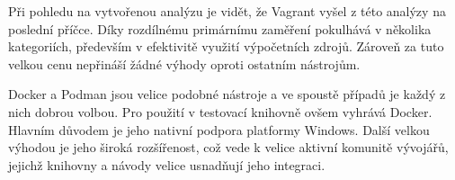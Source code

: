 Při pohledu na vytvořenou analýzu je vidět, že Vagrant vyšel z této analýzy na poslední příčce. Díky rozdílnému primárnímu zaměření pokulhává v několika kategoriích, především v efektivitě využití výpočetních zdrojů. Zároveň za tuto velkou cenu nepřináší žádné výhody oproti ostatním nástrojům.

Docker a Podman jsou velice podobné nástroje a ve spoustě případů je každý z nich dobrou volbou. Pro použití v testovací knihovně ovšem vyhrává Docker. Hlavním důvodem je jeho nativní podpora platformy Windows. Další velkou výhodou je jeho široká rozšířenost, což vede k velice aktivní komunitě vývojářů, jejichž knihovny a návody velice usnadňují jeho integraci. 